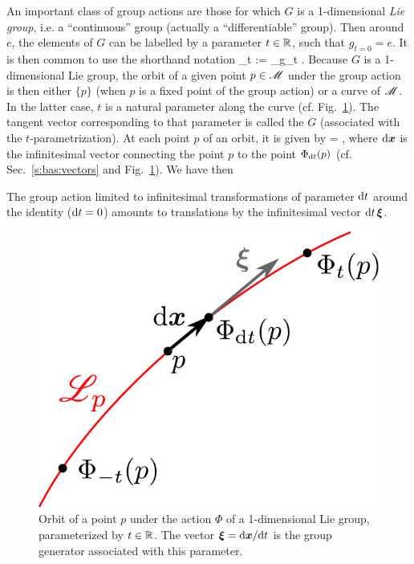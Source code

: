 An important class of group actions are those for which $G$ is a 1-dimensional
\emph{Lie group}, i.e. a ``continuous'' group (actually a ``differentiable'' group).
Then around $e$, the elements of $G$ can be labelled by a parameter $t\in \mathbb{R}$, such that $g_{t=0} = e$. It is then
common to use the shorthand notation
\be
        \Phi_t := \Phi_{g_t} .
\ee
Because $G$ is a 1-dimensional Lie group, the orbit of a given point $p\in\mathscr{M}$ under the group action is then either $\{p\}$ (when $p$ is a fixed point of the
group action) or a curve of $\mathscr{M}$. In the latter case,
$t$ is a natural parameter along the curve (cf. Fig.~\ref{f:neh:orbit_group}). The tangent vector corresponding to that parameter is called the  $G$
(associated with the $t$-parametrization). At each point $p$ of
an orbit, it is given by
\be \label{e:neh:xi_dxdt}
    \w{\xi} =  ,
\ee
where $\mathrm{d}\bm{x}$ is the infinitesimal vector connecting the point $p$ to the point
$\Phi_{\mathrm{d} t}(p)$ (cf. Sec.~\ref{s:bas:vectors} and Fig.~\ref{f:neh:orbit_group}).
We have then
\begin{prop}
The group action limited to infinitesimal transformations of parameter
$\mathrm{d} t$ around the identity ($\mathrm{d} t =0$) amounts to translations by the infinitesimal vector $\mathrm{d} t\, \bm{\xi}$.
\end{prop}

\begin{figure}
\centerline{\includegraphics[height=0.25\textheight]{def_orbit_group.pdf}}
\caption[]{\label{f:neh:orbit_group} \footnotesize
Orbit of a point $p$ under the action $\Phi$ of a 1-dimensional Lie group, parameterized
by $t\in\mathbb{R}$. The vector $\bm{\xi} = \mathrm{d}\bm{x}/\mathrm{d} t$ is the group
generator associated with this parameter.}
\end{figure}


